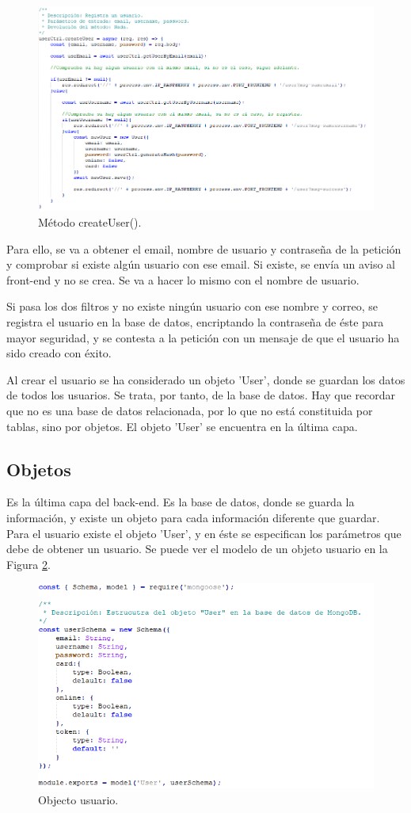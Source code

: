 \begin{figure}[h] 
    \centering
    \includegraphics[width=.80\textwidth]{capitulos/capitulo8/usercontroller.png}
    \caption{Método createUser().}
    \label{fig:controller}
\end{figure}

Para ello, se va a obtener el email, nombre de usuario y contraseña de la petición y comprobar si existe algún usuario con ese email. Si existe, se envía un aviso al front-end y no se crea. Se va a hacer lo mismo con el nombre de usuario. 

Si pasa los dos filtros y no existe ningún usuario con ese nombre y correo, se registra el usuario en la base de datos, encriptando la contraseña de éste para mayor seguridad, y se contesta a la petición con un mensaje de que el usuario ha sido creado con éxito.

Al crear el usuario se ha considerado un objeto 'User', donde se guardan los datos de todos los usuarios. Se trata, por tanto, de la base de datos. Hay que recordar que no es una base de datos relacionada, por lo que no está constituida por tablas, sino por objetos. El objeto 'User' se encuentra en la última capa.

\subsection{Objetos}
Es la última capa del back-end. Es la base de datos, donde se guarda la información, y existe un objeto para cada información diferente que guardar. Para el usuario existe el objeto 'User', y en éste se especifican los parámetros que debe de obtener un usuario. Se puede ver el modelo de un objeto usuario en la Figura \ref{fig:object}.

\begin{figure}[h] 
    \centering
    \includegraphics[width=.80\textwidth]{capitulos/capitulo8/modeluser.png}
    \caption{Objecto usuario.}
    \label{fig:object}
\end{figure}

